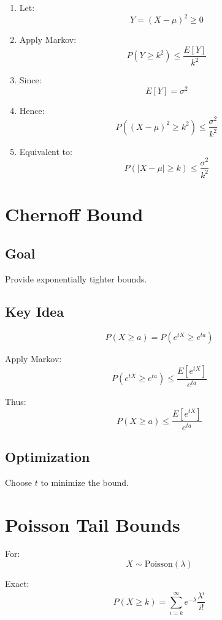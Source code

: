 \documentclass[12pt]{article}
\begin{document}
\begin{enumerate}
    \item Let:
    \[
    Y = (X - \mu)^2 \ge 0
    \]
    
    \item Apply Markov:
    \[
    P(Y \ge k^2) \le \frac{E[Y]}{k^2}
    \]
    
    \item Since:
    \[
    E[Y] = \sigma^2
    \]
    
    \item Hence:
    \[
    P((X - \mu)^2 \ge k^2) \le \frac{\sigma^2}{k^2}
    \]
    
    \item Equivalent to:
    \[
    P(|X - \mu| \ge k) \le \frac{\sigma^2}{k^2}
    \]
\end{enumerate}
\newpage
\section{Chernoff Bound}

\subsection{Goal}

Provide exponentially tighter bounds.

\subsection{Key Idea}

\[
P(X \ge a) = P(e^{tX} \ge e^{ta})
\]

Apply Markov:
\[
P(e^{tX} \ge e^{ta}) \le \frac{E[e^{tX}]}{e^{ta}}
\]

Thus:
\[
P(X \ge a) \le \frac{E[e^{tX}]}{e^{ta}}
\]

\subsection{Optimization}

Choose $t$ to minimize the bound.

\section{Poisson Tail Bounds}

For:
\[
X \sim \text{Poisson}(\lambda)
\]

Exact:
\[
P(X \ge k) = \sum_{i=k}^{\infty} e^{-\lambda} \frac{\lambda^i}{i!}
\]
\end{document}
